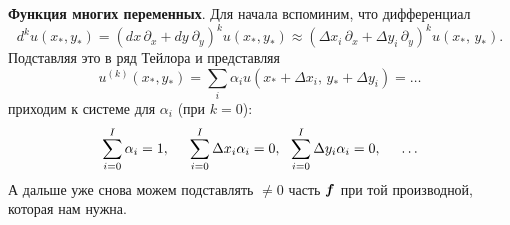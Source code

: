 \textbf{Функция многих переменных}. 
Для начала вспоминим, что дифференциал
\begin{equation*}
    d^k u(x_*, y_*) = (dx\, \partial_x + dy \ \partial_y)^k u(x_*, y_*) \approx
    \left(
        \Delta x_i \,\partial_x + \Delta y_i \, \partial_y
    \right)^k u(x_*,\, y_*).
\end{equation*}
Подставляя это в ряд Тейлора и представляя 
\begin{equation*}
    u^{(k)}(x_*, y_*) = \sum_i \alpha_i u(x_* + \Delta x_i,\, y_* + \Delta y_i) = \ldots
\end{equation*}
приходим к системе для $\alpha_i$ (при $k=0$):
\begin{equation*}
    \sum_{i=0}^{I} \alpha_i = 1,
    \hspace{5 mm} 
    \sum_{i=0}^{I} \Delta x_i \alpha_i = 0, \ \ \sum_{i=0}^{I} \Delta y_i \alpha_i = 0, \hspace{5 mm} \ldots
\end{equation*}
А дальше уже снова можем подставлять $\neq 0$ часть $\mbox{\boldmath $f$}$ при той производной, которая нам нужна.
